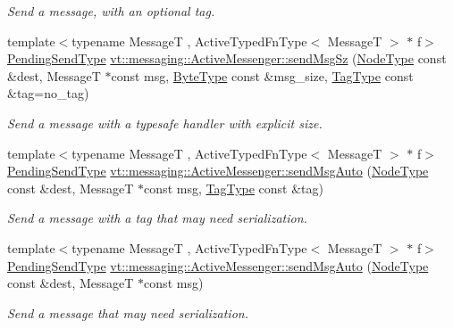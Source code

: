 \begin{DoxyCompactItemize}
\begin{DoxyCompactList}\small\item\em Send a message, with an optional tag. \end{DoxyCompactList}\item 
{\footnotesize template$<$typename MessageT , Active\+Typed\+Fn\+Type$<$ Message\+T $>$ $\ast$ f$>$ }\\\hyperlink{structvt_1_1messaging_1_1_active_messenger_a3626a6ca76d8ad4ec7c3b47a2c70d3a8}{Pending\+Send\+Type} \hyperlink{group__typesafehan_ga542b5ab1a0df0b906fc8ebcd146f6f38}{vt\+::messaging\+::\+Active\+Messenger\+::send\+Msg\+Sz} (\hyperlink{namespacevt_a866da9d0efc19c0a1ce79e9e492f47e2}{Node\+Type} const \&dest, MessageT $\ast$const msg, \hyperlink{namespacevt_aab8d55968084610ce3b17057981e9300}{Byte\+Type} const \&msg\+\_\+size, \hyperlink{namespacevt_a84ab281dae04a52a4b243d6bf62d0e52}{Tag\+Type} const \&tag=no\+\_\+tag)
\begin{DoxyCompactList}\small\item\em Send a message with a typesafe handler with explicit size. \end{DoxyCompactList}\item 
{\footnotesize template$<$typename MessageT , Active\+Typed\+Fn\+Type$<$ Message\+T $>$ $\ast$ f$>$ }\\\hyperlink{structvt_1_1messaging_1_1_active_messenger_a3626a6ca76d8ad4ec7c3b47a2c70d3a8}{Pending\+Send\+Type} \hyperlink{group__typesafehan_ga84371d67ef22e1d96caceb5d5e14dad4}{vt\+::messaging\+::\+Active\+Messenger\+::send\+Msg\+Auto} (\hyperlink{namespacevt_a866da9d0efc19c0a1ce79e9e492f47e2}{Node\+Type} const \&dest, MessageT $\ast$const msg, \hyperlink{namespacevt_a84ab281dae04a52a4b243d6bf62d0e52}{Tag\+Type} const \&tag)
\begin{DoxyCompactList}\small\item\em Send a message with a tag that may need serialization. \end{DoxyCompactList}\item 
{\footnotesize template$<$typename MessageT , Active\+Typed\+Fn\+Type$<$ Message\+T $>$ $\ast$ f$>$ }\\\hyperlink{structvt_1_1messaging_1_1_active_messenger_a3626a6ca76d8ad4ec7c3b47a2c70d3a8}{Pending\+Send\+Type} \hyperlink{group__typesafehan_ga290810b32eb5fa3bd2be8bf19d9c62af}{vt\+::messaging\+::\+Active\+Messenger\+::send\+Msg\+Auto} (\hyperlink{namespacevt_a866da9d0efc19c0a1ce79e9e492f47e2}{Node\+Type} const \&dest, MessageT $\ast$const msg)
\begin{DoxyCompactList}\small\item\em Send a message that may need serialization. \end{DoxyCompactList}\item 

\end{DoxyCompactItemize}
